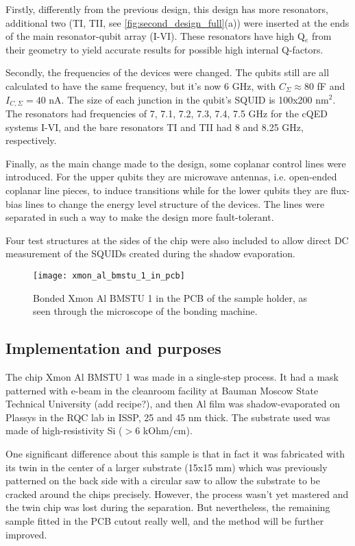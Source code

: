 \documentclass[12pt, twoside]{report}
\numberwithin{equation}{section}
\begin{document}
Firstly, differently from the previous design, this design has more resonators, additional two (TI, TII, see \autoref{fig:second_design_full}(a)) were inserted at the ends of the main resonator-qubit array (I-VI). These resonators have high Q$_e$ from their geometry to yield accurate results for possible high internal Q-factors.

Secondly, the frequencies of the devices were changed. The qubits still are all calculated to have the same frequency, but it's now 6 GHz, with $C_\Sigma \approx 80$ fF and $I_{C, \Sigma} = 40$ nA. The size of each junction in the qubit's SQUID is 100x200 nm$^2$. The resonators had frequencies of 7, 7.1, 7.2, 7.3, 7.4, 7.5 GHz for the cQED systems I-VI, and the bare resonators TI and TII had 8 and 8.25 GHz, respectively.

Finally, as the main change made to the design, some coplanar control lines were introduced. For the upper qubits they are microwave antennas, i.e. open-ended coplanar line pieces, to induce transitions while for the lower qubits they are flux-bias lines to change the energy level structure of the devices. The lines were separated in such a way to make the design more fault-tolerant.

Four test structures at the sides of the chip were also included to allow direct DC measurement of the SQUIDs created during the shadow evaporation.


\begin{figure}
\centering
\texttt{[image: xmon\_al\_bmstu\_1\_in\_pcb]}
\caption{Bonded Xmon Al BMSTU 1 in the PCB of the sample holder, as seen through the microscope of the bonding machine.}
\end{figure}

\subsection{Implementation and purposes}

The chip Xmon Al BMSTU 1 was made in a single-step process. It had a mask patterned with e-beam in the cleanroom facility at Bauman Moscow State Technical University (add recipe?), and then Al film was shadow-evaporated on Plassys in the RQC lab in ISSP, 25 and 45 nm thick. The substrate used was made of high-resistivity Si ($> 6$ kOhm/cm).

One significant difference about this sample is that in fact it was fabricated with its twin in the center of a larger substrate (15x15 mm) which was previously patterned on the back side with a circular saw to allow the substrate to be cracked around the chips precisely. However, the process wasn't yet mastered and the twin chip was lost during the separation. But nevertheless, the remaining sample fitted in the PCB cutout really well, and the method will be further improved.
\end{document}
